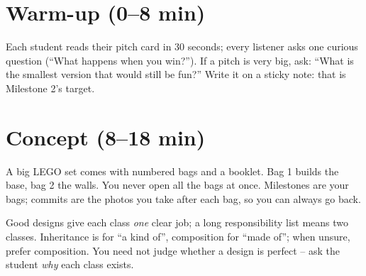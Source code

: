 \section{Warm-up (0--8 min)}
Each student reads their pitch card in 30 seconds; every listener asks one curious question (\enquote{What happens when you win?}). If a pitch is very big, ask: \enquote{What is the smallest version that would still be fun?} Write it on a sticky note: that is Milestone 2's target.

\section{Concept (8--18 min)}

\begin{analogy}
A big LEGO set comes with numbered bags and a booklet. Bag 1 builds the base, bag 2 the walls. You never open all the bags at once. Milestones are your bags; commits are the photos you take after each bag, so you can always go back.
\end{analogy}

\begin{teachernote}
Good designs give each class \emph{one} clear job; a long responsibility list means two classes. Inheritance is for \enquote{a kind of}, composition for \enquote{made of}; when unsure, prefer composition. You need not judge whether a design is perfect -- ask the student \emph{why} each class exists.
\end{teachernote}

